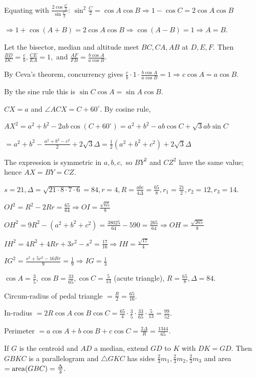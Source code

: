   Equating with $\frac{2\cos\frac{C}{2}}{\sin\frac{C}{2}}$: $\sin^2\frac{C}{2} = \cos A\cos B\Rightarrow 1 - \cos C = 2\cos
  A\cos B$

  $\Rightarrow 1 + \cos(A + B) = 2\cos A\cos B\Rightarrow \cos(A - B) = 1\Rightarrow A = B.$
\item Let the bisector, median and altitude meet $BC, CA, AB$ at $D, E, F.$ Then $\frac{BD}{DC} = \frac{c}{b},
  \frac{CE}{EA} = 1,$ and $\frac{AF}{FB} = \frac{b\cos A}{a\cos B}.$

  By Ceva's theorem, concurrency gives $\frac{c}{b}\cdot 1\cdot\frac{b\cos A}{a\cos B} = 1\Rightarrow c\cos A = a\cos B.$

  By the sine rule this is $\sin C\cos A = \sin A\cos B.$
\item $CX = a$ and $\angle ACX = C + 60^\circ.$ By cosine rule,

  $AX^2 = a^2 + b^2 - 2ab\cos(C + 60^\circ) = a^2 + b^2 - ab\cos C + \sqrt{3}ab\sin C$

  $= a^2 + b^2 - \frac{a^2 + b^2 - c^2}{2} + 2\sqrt{3}\Delta = \frac{1}{2}(a^2 + b^2 + c^2) + 2\sqrt{3}\Delta$

  The expression is symmetric in $a, b, c,$ so $BY^2$ and $CZ^2$ have the same value; hence $AX = BY = CZ.$
\item $s = 21, \Delta = \sqrt{21\cdot 8\cdot 7\cdot 6} = 84, r = 4, R = \frac{abc}{4\Delta} = \frac{65}{8}, r_1 =
  \frac{21}{2}, r_2 = 12, r_3 = 14.$

  $OI^2 = R^2 - 2Rr = \frac{65}{64}\Rightarrow OI = \frac{\sqrt{65}}{8}$

  $OH^2 = 9R^2 - (a^2 + b^2 + c^2) = \frac{38025}{64} - 590 = \frac{265}{64}\Rightarrow OH = \frac{\sqrt{265}}{8}$

  $IH^2 = 4R^2 + 4Rr + 3r^2 - s^2 = \frac{17}{16}\Rightarrow IH = \frac{\sqrt{17}}{4}$

  $IG^2 = \frac{s^2 + 5r^2 - 16Rr}{9} = \frac{1}{9}\Rightarrow IG = \frac{1}{3}$
\item $\cos A = \frac{3}{5}, \cos B = \frac{33}{65}, \cos C = \frac{5}{13}$ (acute triangle), $R = \frac{65}{8}, \Delta = 84.$

  Circum-radius of pedal triangle $= \frac{R}{2} = \frac{65}{16}.$

  In-radius $= 2R\cos A\cos B\cos C = \frac{65}{4}\cdot\frac{3}{5}\cdot\frac{33}{65}\cdot\frac{5}{13} = \frac{99}{52}.$

  Perimeter $= a\cos A + b\cos B + c\cos C = \frac{2\Delta}{R} = \frac{1344}{65}.$
\item If $G$ is the centroid and $AD$ a median, extend $GD$ to $K$ with $DK = GD.$ Then $GBKC$ is a parallelogram and
  $\triangle GKC$ has sides $\frac{2}{3}m_1, \frac{2}{3}m_2, \frac{2}{3}m_3$ and area $= {\rm area}(GBC) = \frac{\Delta}{3}.$

